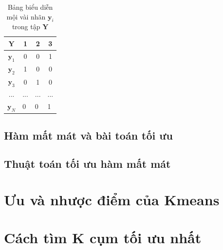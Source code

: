 \documentclass{article}
\begin{document}
\begin{table}[h]
	\centering
	\begin{tabular}{|c|c|c|c|}
		\hline
		$\mathbf{Y}$                           & 1                      & 2                       & 3                       \\ \hline
		$\mathbf{y}_1$                         & 0                      & 0                       & 1                       \\ \hline
		$\mathbf{y}_2$                         & 1                      & 0                       & 0                       \\ \hline
		$\mathbf{y}_3$                         & 0                      & 1                       & 0                       \\ \hline
		...                                    & ...                    & ...                     & ...                     \\ \hline
		\multicolumn{1}{|l|}{$\mathbf{y}_N$}   & \multicolumn{1}{l|}{0} & \multicolumn{1}{l|}{0}  & \multicolumn{1}{l|}{1}  \\ \hline
	\end{tabular}
	\caption{Bảng biểu diễn mội vài nhãn $\mathbf{y}_i$ trong tập $\mathbf{Y}$}
	\label{tab:tbexample}
	\end{table}
	\newpage
	\subsection{Hàm mất mát và bài toán tối ưu}
	\subsection{Thuật toán tối ưu hàm mất mát}
	\newpage
	\section{Ưu và nhược điểm của Kmeans} %
	
	\newpage
	\section{Cách tìm K cụm tối ưu nhất}
	
\end{document}
